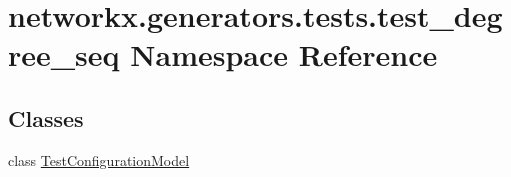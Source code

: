 \hypertarget{namespacenetworkx_1_1generators_1_1tests_1_1test__degree__seq}{}\section{networkx.\+generators.\+tests.\+test\+\_\+degree\+\_\+seq Namespace Reference}
\label{namespacenetworkx_1_1generators_1_1tests_1_1test__degree__seq}
\subsection*{Classes}
\begin{DoxyCompactItemize}
\item 
class \hyperlink{classnetworkx_1_1generators_1_1tests_1_1test__degree__seq_1_1TestConfigurationModel}{Test\+Configuration\+Model}
\end{DoxyCompactItemize}
